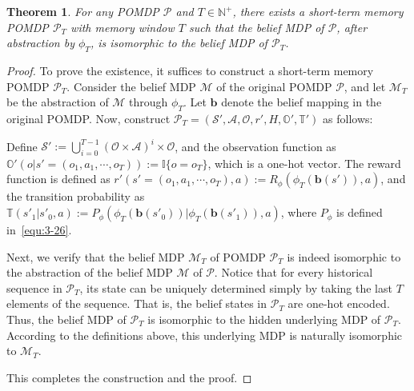 \documentclass[twoside]{article}
\newtheorem{theorem}{Theorem}
\newcommand{\N}{\mathbb{N}}
\newcommand{\CAL}[1]{\mathcal{#1}}
\begin{document}
\begin{theorem}\label{Thm:POMDP_existance}
For any POMDP $\mathcal{P}$ and $T \in \N^+$, there exists a short-term memory POMDP $\mathcal{P}_T$ with memory window $T$ such that the belief MDP of $\mathcal{P}$, after abstraction by $\phi_T$, is isomorphic to the belief MDP of $\mathcal{P}_T$. %
\end{theorem}
\begin{proof}
To prove the existence, it suffices to construct a short-term memory POMDP $\mathcal{P}_T$. Consider the belief MDP $\CAL{M}$ of the original POMDP $\mathcal{P}$, and let $\CAL{M}_T$ be the abstraction of $\CAL{M}$ through $\phi_T$. Let $\mathbf{b}$ denote the belief mapping in the original POMDP. Now, construct $\mathcal{P}_T = (\CAL{S}', \CAL{A}, \CAL{O}, r', H, \mathbb{O}', \mathbb{T}')$ as follows:

Define $\CAL{S}' := \bigcup_{i=0}^{T-1} (\CAL{O} \times \CAL{A})^i \times \CAL{O}$, and the observation function as $\mathbb{O}'(o | s' = (o_1, a_1, \cdots, o_T)) := \mathbb{I}\{o = o_T\}$, which is a one-hot vector.
The reward function is defined as $r'(s' = (o_1, a_1, \cdots, o_T), a) := R_\phi(\phi_T(\mathbf{b}(s')), a)$, and the transition probability as $\mathbb{T}(s'_1 | s'_0, a) := P_\phi(\phi_T(\mathbf{b}(s'_0)) | \phi_T(\mathbf{b}(s'_1)), a)$, where $P_\phi$ is defined in~\eqref{equ:3-26}.

Next, we verify that the belief MDP $\CAL{M}_T$ of POMDP $\mathcal{P}_T$ is indeed isomorphic to the abstraction of the belief MDP $\CAL{M}$ of $\mathcal{P}$. Notice that for every historical sequence in $\CAL{P}_T$, its state can be uniquely determined simply by taking the last $T$ elements of the sequence. That is, the belief states in $\CAL{P}_T$ are one-hot encoded.
Thus, the belief MDP of $\CAL{P}_T$ is isomorphic to the hidden underlying MDP of $\CAL{P}_T$. According to the definitions above, this underlying MDP is naturally isomorphic to $\CAL{M}_T$.

This completes the construction and the proof.
\end{proof}
\end{document}
